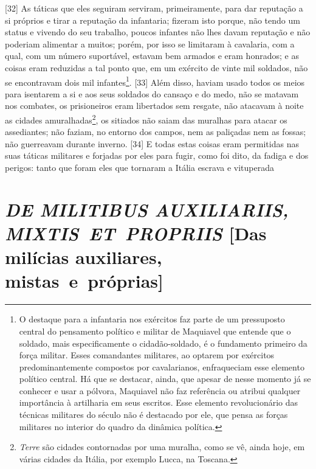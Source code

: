 {[}32{]} As táticas que eles seguiram serviram, primeiramente, para dar
reputação a si próprios e tirar a reputação da infantaria; fizeram isto
porque, não tendo um status e vivendo do seu trabalho, poucos infantes
não lhes davam reputação e não poderiam alimentar a muitos; porém, por
isso se limitaram à cavalaria, com a qual, com um número suportável,
estavam bem armados e eram honrados; e as coisas eram reduzidas a tal
ponto que, em um exército de vinte mil soldados, não se encontravam dois
mil infantes\footnote{O destaque para a infantaria nos exércitos faz
  parte de um pressuposto central do pensamento político e militar de
  Maquiavel que entende que o soldado, mais especificamente o
  cidadão-soldado, é o fundamento primeiro da força militar. Esses
  comandantes militares, ao optarem por exércitos predominantemente
  compostos por cavalarianos, enfraqueciam esse elemento político
  central. Há que se destacar, ainda, que apesar de nesse momento já se
  conhecer e usar a pólvora, Maquiavel não faz referência ou atribui
  qualquer importância à artilharia em seus escritos. Esse elemento
  revolucionário das técnicas militares do século  não é destacado
  por ele, que pensa as forças militares no interior do quadro da
  dinâmica política.}. {[}33{]} Além disso, haviam usado todos os meios
para isentarem a si e aos seus soldados do cansaço e do medo, não se
matavam nos combates, os prisioneiros eram libertados sem resgate, não
atacavam à noite as cidades amuralhadas\footnote{\emph{Terre} são
  cidades contornadas por uma muralha, como se vê, ainda hoje, em várias
  cidades da Itália, por exemplo Lucca, na Toscana.}, os sitiados não
saiam das muralhas para atacar os assediantes; não faziam, no entorno
dos campos, nem as paliçadas nem as fossas; não guerreavam durante
inverno. {[}34{]} E todas estas coisas eram permitidas nas suas táticas
militares e forjadas por eles para fugir, como foi dito, da fadiga e dos
perigos: tanto que foram eles que tornaram a Itália escrava e vituperada

\quebra\section{\emph{DE MILITIBUS AUXILIARIIS, MIXTIS~ET~PROPRIIS}\break
{[}Das milícias auxiliares, mistas~e~próprias{]}}

